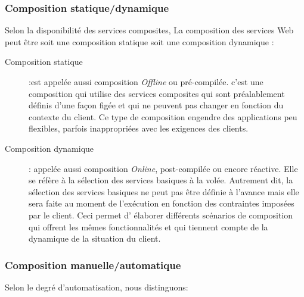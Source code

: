     \subsubsection{Composition statique/dynamique}
    \label{sec:comp-stat}
    Selon la disponibilité des services composites, La composition des
    services Web peut être soit une composition statique soit une
    composition dynamique \cite{driss2011approche}:\medskip

    \renewcommand{\descriptionlabel}[1]{\hspace{0.5cm}\textbullet~\textsf{#1}}
    \begin{description}
    \item[Composition statique] :est appelée aussi composition
      \textit{Offline} ou pré-compilée. c'est une composition qui
      utilise des services composites qui sont préalablement définis
      d'une façon figée et qui ne peuvent pas changer en fonction du
      contexte du client. Ce type de composition engendre des
      applications peu flexibles, parfois inappropriées avec les
      exigences des clients.\medskip

    \item[Composition dynamique]: appelée aussi composition
      \textit{Online}, post-compilée ou encore réactive. Elle se
      réfère à la sélection des services basiques à la volée. Autrement
      dit, la sélection des services basiques ne peut pas être définie
      à l'avance mais elle sera faite au moment de l'exécution en
      fonction des contraintes imposées par le client. Ceci permet d'
      élaborer différents scénarios de composition qui offrent les
      mêmes fonctionnalités et qui tiennent compte de la dynamique de
      la situation du client.
    \end{description}
    \enddescription

    \subsubsection{Composition manuelle/automatique}
    \label{sec:comp-manu}
    Selon le degré d'automatisation, nous distinguons:

